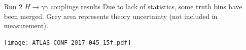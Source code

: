 \begin{frame}{Run 2 $H\rightarrow \gamma\gamma$  couplings results}
  \centering
  Due to lack of statistics, some truth bins have been merged.
  Grey area represents theory uncertainty (not included in measurement).

  \texttt{[image: ATLAS-CONF-2017-045\_15f.pdf]}

\end{frame}
